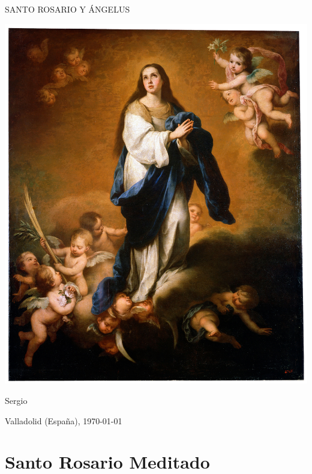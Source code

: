 \documentclass[10pt,twoside]{book}
\begin{document}
\begin{titlepage}
      \begin{center}

            \vspace*{10em}

            {\Huge \uppercase{Santo Rosario y Ángelus}}
            
            \vspace{1.5em}
            
            {\includegraphics[scale=0.95]{foto-04.jpg}}
            
            \vspace{0.5em}
            
            Sergio

            Valladolid (España), \monthyeardate\today
      \end{center}
\end{titlepage}
\chapter*{Santo Rosario Meditado}
\end{document}
